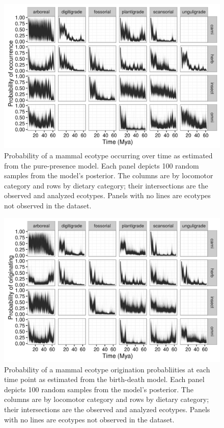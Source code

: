 \documentclass[12pt,letterpaper]{article}
\begin{document}
\begin{figure}[ht]
  \centering
  \includegraphics[width=\textwidth,height=0.4\textheight,keepaspectratio=true]{figure/ecotype_occurrence}
  \caption[Ecotype occurrence probability estimated from the pure-presence model]{Probability of a mammal ecotype occurring over time as estimated from the pure-presence model. Each panel depicts 100 random samples from the model's posterior. The columns are by locomotor category and rows by dietary category; their intersections are the observed and analyzed ecotypes. Panels with no lines are ecotypes not observed in the dataset.}
  \label{fig:eco_occur}
\end{figure}

\begin{figure}[ht]
  \centering
  \includegraphics[width=\textwidth,height=0.4\textheight,keepaspectratio=true]{figure/ecotype_origin_bd}
  \caption[Ecotype origination probability estimated from the birth-death model]{Probability of a mammal ecotype origination probabliities at each time point as estimated from the birth-death model. Each panel depicts 100 random samples from the model's posterior. The columns are by locomotor category and rows by dietary category; their intersections are the observed and analyzed ecotypes. Panels with no lines are ecotypes not observed in the dataset.}
  \label{fig:eco_origin}
\end{figure}
\end{document}
